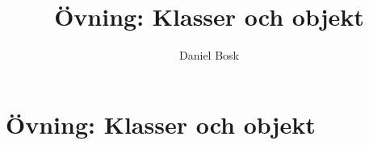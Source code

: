\documentclass[a4paper,10pt,oneside,openright,
               oldfontcommands]{memoir}
\begin{document}
\title{%
  Övning: Klasser och objekt
}
\author{Daniel Bosk}

\maketitle

\begin{abstract}
  
\end{abstract}

\clearpage

\tableofcontents*

\chapter{Övning: Klasser och objekt}



\appendix


\printbibliography
\end{document}
